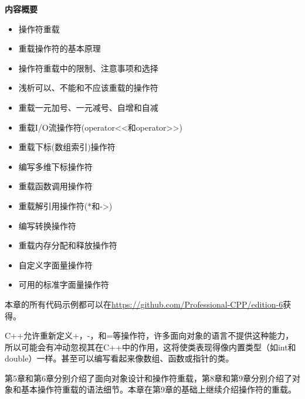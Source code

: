 \noindent
\textbf{内容概要}

\begin{itemize}
\item
操作符重载

\item
重载操作符的基本原理

\item
操作符重载中的限制、注意事项和选择

\item
浅析可以、不能和不应该重载的操作符

\item
重载一元加号、一元减号、自增和自减

\item
重载I/O流操作符(operator<{}<和operator>{}>)

\item
重载下标(数组索引)操作符

\item
编写多维下标操作符

\item
重载函数调用操作符

\item
重载解引用操作符(*和->)

\item
编写转换操作符

\item
重载内存分配和释放操作符

\item
自定义字面量操作符

\item
可用的标准字面量操作符
\end{itemize}

本章的所有代码示例都可以在\url{https://github.com/Professional-CPP/edition-6}获得。

C++允许重新定义+，-，和=等操作符，许多面向对象的语言不提供这种能力，所以可能会有冲动忽视其在C++中的作用，这将使类表现得像内置类型（如int和double）一样。甚至可以编写看起来像数组、函数或指针的类。

第5章和第6章分别介绍了面向对象设计和操作符重载，第8章和第9章分别介绍了对象和基本操作符重载的语法细节。本章在第9章的基础上继续介绍操作符的重载。












